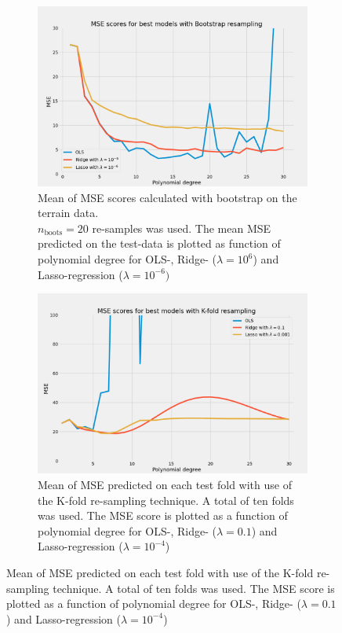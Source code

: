 \begin{figure}[H]
    \centering
    \begin{subfigure}[b]{0.49\textwidth}
        \includegraphics[width=\textwidth]{Figures/terrain_best_ols_ridge_lasso_boots.png}
        \caption{Mean of MSE scores calculated with bootstrap on the terrain data.\\ $n_{\text{boots}} =
        20$ re-samples was used. The mean MSE predicted on the test-data is plotted as
    function of polynomial degree for OLS-, Ridge- ($\lambda = 10^{6}$) and
Lasso-regression ($\lambda = 10^{-6})$   }  
    \end{subfigure}
    \begin{subfigure}[b]{0.49\textwidth}
        \includegraphics[width=\textwidth]{Figures/terrain_best_ols_ridge_lasso_kfold.png}
        \caption{Mean of MSE predicted on each test fold with use of the K-fold
        re-sampling technique. A total of ten folds was used. The MSE score is plotted as a function
    of polynomial degree for OLS-, Ridge- ($\lambda = 0.1$) and Lasso-regression
($\lambda = 10^{-4}$)}  
    \end{subfigure}
\end{figure}



